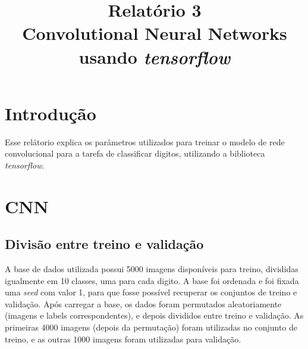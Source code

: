 \documentclass[conference]{IEEEtran}
\begin{document}
\title{%
  Relatório 3 \\
  \large Convolutional Neural Networks \\
    usando \textit{tensorflow}}

\author{
}


\maketitle

\section{Introdução}
Esse relátorio explica os parâmetros utilizados para treinar o modelo de rede convolucional para a tarefa de classificar digitos, utilizando a biblioteca \textit{tensorflow}.

\section{CNN}

\subsection{Divisão entre treino e validação}
A base de dados utilizada possui 5000 imagens disponíveis para treino, divididas igualmente em 10 classes, uma para cada digito. A base foi ordenada e foi fixada uma \textit{seed} com valor 1, para que fosse possível recuperar os conjuntos de treino e validação. Após carregar a base, os dados foram permutados aleatoriamente (imagens e labels correspondentes), e depois divididos entre treino e validação. As primeiras 4000 imagens (depois da permutação) foram utilizadas no conjunto de treino, e as outras 1000 imagens foram utilizadas para validação.
\end{document}
